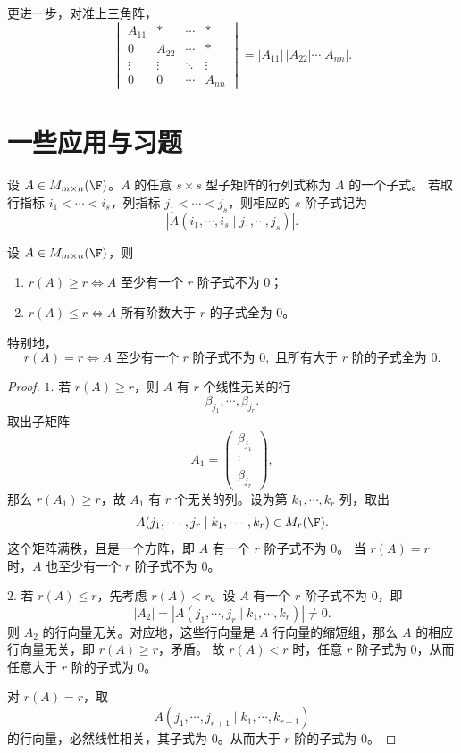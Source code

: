 更进一步，对准上三角阵，
\[
\begin{vmatrix}
	A_{11}&*&\cdots&*\\
	0&A_{22}&\cdots&*\\
	\vdots&\vdots&\ddots&\vdots\\
	0&0&\cdots&A_{nn}
\end{vmatrix}
=|A_{11}|\,|A_{22}|\cdots|A_{nn}|.
\]

\section{一些应用与习题}

\begin{definition}\label{3.9.1}
	设 $A\in M_{m\times n}(\F)$。$A$ 的任意 $s\times s$ 型子矩阵的行列式称为 $A$ 的一个子式。
	若取行指标 $i_1<\cdots<i_s$，列指标 $j_1<\cdots<j_s$，则相应的 $s$ 阶子式记为
	\[
	\left|A(i_1,\cdots,i_s\mid j_1,\cdots,j_s)\right|.
	\]
\end{definition}

\begin{proposition}\label{3.9.2}
	设 $A\in M_{m\times n}(\F)$，则
	\begin{enumerate}
		\item $r(A)\geq r\Longleftrightarrow A$ 至少有一个 $r$ 阶子式不为 $0$；
		\item $r(A)\leq r\Longleftrightarrow A$ 所有阶数大于 $r$ 的子式全为 $0$。
	\end{enumerate}
	特别地，
	\[
	r(A)=r
	\Longleftrightarrow
	A\text{ 至少有一个 }r\text{ 阶子式不为 }0,
	\text{ 且所有大于 }r\text{ 阶的子式全为 }0.
	\]
\end{proposition}

\begin{proof}
	$1.$ 若 $r(A)\geq r$，则 $A$ 有 $r$ 个线性无关的行
	\[
	\beta_{j_1},\cdots,\beta_{j_r}.
	\]
	取出子矩阵
	\[
	A_1=\begin{pmatrix}
		\beta_{j_1}\\
		\vdots\\
		\beta_{j_r}
	\end{pmatrix},
	\]
	那么 $r(A_1)\geq r$，故 $A_1$ 有 $r$ 个无关的列。设为第 $k_1,\cdots,k_r$ 列，取出
	\[
	A(j_1,\cdots,j_r\mid k_1,\cdots,k_r)\in M_r(\F).
	\]
	这个矩阵满秩，且是一个方阵，即 $A$ 有一个 $r$ 阶子式不为 $0$。
	当 $r(A)=r$ 时，$A$ 也至少有一个 $r$ 阶子式不为 $0$。
	
	$2.$ 若 $r(A)\leq r$，先考虑 $r(A)<r$。设 $A$ 有一个 $r$ 阶子式不为 $0$，即
	\[
	|A_2|=\left|A(j_1,\cdots,j_r\mid k_1,\cdots,k_r)\right|\neq0.
	\]
	则 $A_2$ 的行向量无关。对应地，这些行向量是 $A$ 行向量的缩短组，那么 $A$ 的相应行向量无关，即 $r(A)\geq r$，矛盾。
	故 $r(A)<r$ 时，任意 $r$ 阶子式为 $0$，从而任意大于 $r$ 阶的子式为 $0$。
	
	对 $r(A)=r$，取
	\[
	A(j_1,\cdots,j_{r+1}\mid k_1,\cdots,k_{r+1})
	\]
	的行向量，必然线性相关，其子式为 $0$。从而大于 $r$ 阶的子式为 $0$。
\end{proof}


